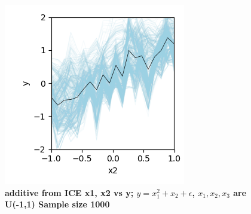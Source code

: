 \documentclass[12pt]{article}
\begin{document}
\begin{figure}[htbp]
\begin{center}
\includegraphics[scale=0.7]{images/add_x2_y_pdp.png}
\caption{{\bf  additive from ICE x1, x2 vs y; $y = x_1^2 + x_2 + \epsilon$, $x_1, x_2, x_3$ are U(-1,1) Sample size 1000}}
\label{fig:add_x1_y_stratpd}
\end{center}
\end{figure}
\end{document}

